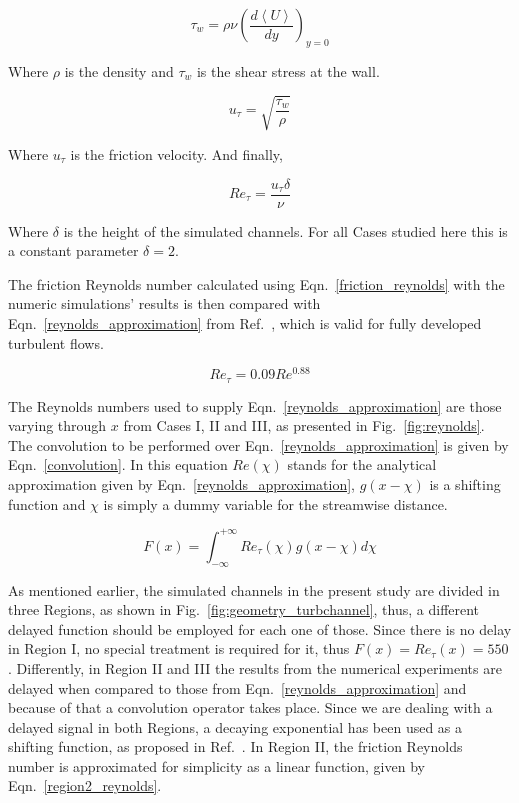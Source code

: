 \documentclass[twocolumn,10pt]{asme2e}
\begin{document}
\begin{equation}
{\tau}_w = \rho\nu\left(\frac{d\left<U\right>}{dy}\right)_{y=0}
\label{shear_wall}
\end{equation}

Where \(\rho\) is the density and \({\tau}_w\)  is the shear stress at the wall.

\begin{equation}
u_{\tau} = \sqrt{\frac{{\tau}_w}{\rho}}
\label{u_t}
\end{equation}

Where \(u_{\tau}\) is the friction velocity. And finally,

\begin{equation}
Re_{\tau} = \frac{u_{\tau}\delta}{\nu}
\label{friction_reynolds}
\end{equation}

Where \(\delta\) is the height of the simulated channels. For all Cases studied here this is a constant parameter \(\delta=2\).

The friction Reynolds number calculated using Eqn.~\ref{friction_reynolds} with the numeric simulations' results is then compared with Eqn.~\ref{reynolds_approximation} from Ref.~\cite{pope}, which is valid for fully developed turbulent flows.

\begin{equation}
Re_{\tau} = 0.09Re^{0.88}
\label{reynolds_approximation}
\end{equation}

The Reynolds numbers used to supply Eqn.~\ref{reynolds_approximation} are those varying through \(x\) from Cases I, II and III, as presented in Fig.~\ref{fig:reynolds}. The convolution to be performed over Eqn.~\ref{reynolds_approximation} is given by Eqn.~\ref{convolution}. In this equation \(Re(\chi)\) stands for the analytical approximation given by Eqn.~\ref{reynolds_approximation}, \(g(x-\chi)\)  is a shifting function and \(\chi\) is simply a dummy variable for the streamwise distance.

\begin{equation}
F(x) =  \int_{-\infty}^{+\infty} Re_{\tau}(\chi)g(x-\chi)d\chi
\label{convolution}
\end{equation}

As mentioned earlier, the simulated channels in the present study are divided in three Regions, as shown in Fig.~\ref{fig:geometry_turbchannel}, thus, a different delayed function should be employed for each one of those. Since there is no delay in Region I, no special treatment is required for it, thus \(F(x)=Re_{\tau}(x)=550\). Differently, in Region II and III the results from the numerical experiments are delayed when compared to those from Eqn.~\ref{reynolds_approximation} and because of that a convolution operator takes place. Since we are dealing with a delayed signal in both Regions, a decaying exponential has been used as a shifting function, as proposed in Ref.~\cite{signals}. In Region II, the friction Reynolds number is approximated for simplicity as a linear function, given by Eqn.~\ref{region2_reynolds}.
\end{document}
